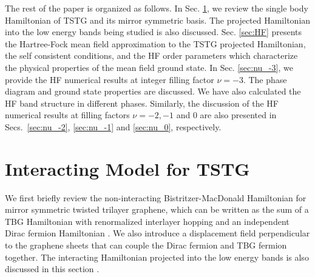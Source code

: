 \documentclass[prb,aps,nofootinbib,amssymb,twocolumn,superscriptaddress,10pt]{revtex4-2}
\begin{document}
The rest of the paper is organized as follows. In Sec. \ref{sec:model}, we review the single body Hamiltonian of TSTG and its mirror symmetric basis. The projected Hamiltonian into the low energy bands being studied is also discussed. 
Sec. \ref{sec:HF} presents the Hartree-Fock mean field approximation to the TSTG projected Hamiltonian, the self consistent conditions, and the HF order parameters which characterize the physical properties of the mean field ground state. 
In Sec. \ref{sec:nu_-3}, we provide the HF numerical results at integer filling factor $\nu=-3$. The phase diagram and ground state properties are discussed. We have also calculated the HF band structure in different phases.
Similarly, the discussion of the HF numerical results at filling factors $\nu=-2, -1$ and $0$ are also presented in Secs.~\ref{sec:nu_-2}, \ref{sec:nu_-1} and \ref{sec:nu_0}, respectively.

\section{Interacting Model for TSTG}\label{sec:model}
We first briefly review the non-interacting Bistritzer-MacDonald Hamiltonian for mirror symmetric twisted trilayer graphene, which can be written as the sum of a TBG Hamiltonian \cite{BIS11} with renormalized interlayer hopping and an independent Dirac fermion Hamiltonian \cite{KHA19,TSTGI}. We also introduce a displacement field perpendicular to the graphene sheets that can couple the Dirac fermion and TBG fermion together. The interacting Hamiltonian projected into the low energy bands is also discussed in this section \cite{TSTGI}.
\end{document}
